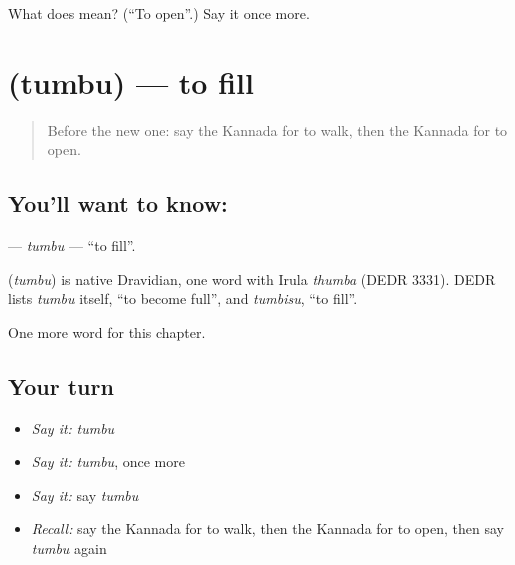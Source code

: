 \begin{tcolorbox}[breakable,colback=teal!4,colframe=teal!35!black,title={Before you move on}]
What does  mean? (\textquotedblleft{}To open\textquotedblright{}.) Say it once more.
\end{tcolorbox}
\section[\texorpdfstring{\kn{ತುಂಬು} (tumbu)}{ತುಂಬು (tumbu)}]{ (tumbu) — to fill}

\label{lesson:KA-C153-tumbu}



\begin{quote}
Before the new one: say the Kannada for to walk, then the Kannada for to open.
\end{quote}

\subsection*{You'll want to know: }
\textbf{} — \emph{tumbu} — \textquotedblleft{}to fill\textquotedblright{}.

\begin{cousinweb}
\textbf{} (\emph{tumbu}) is native Dravidian, one word with Irula \emph{thumba} (DEDR 3331). DEDR lists \emph{tumbu} itself, \textquotedblleft{}to become full\textquotedblright{}, and \emph{tumbisu}, \textquotedblleft{}to fill\textquotedblright{}.
\end{cousinweb}

\begin{grammarlens}[title={What you've built}]
One more word for this chapter.
\end{grammarlens}

\subsection*{Your turn}
\begin{itemize}
\raggedright
  \item \emph{Say it:} \emph{tumbu}
  \item \emph{Say it:} \emph{tumbu}, once more
  \item \emph{Say it:} say \emph{tumbu}
  \item \emph{Recall:} say the Kannada for to walk, then the Kannada for to open, then say \emph{tumbu} again
\end{itemize}

